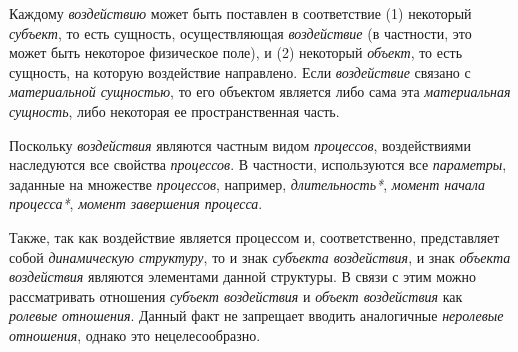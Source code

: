 \begin{frame}{}
    \begin{SCn}
        Каждому \textit{воздействию} может быть поставлен в соответствие (1) некоторый \textit{субъект\scnrolesign}, то есть сущность, осуществляющая \textit{воздействие} (в частности, это может быть некоторое физическое поле), и (2) некоторый \textit{объект\scnrolesign}, то есть сущность, на которую воздействие направлено. Если \textit{воздействие} связано с \textit{материальной сущностью}, то его объектом является либо сама эта \textit{материальная сущность}, либо некоторая ее пространственная часть.

    \end{SCn}
\end{frame}
\begin{frame}{}
    \begin{SCn}
Поскольку \textit{воздействия} являются частным видом \textit{процессов}, воздействиями наследуются все свойства \textit{процессов}. В частности, используются все \textit{параметры}, заданные на множестве \textit{процессов}, например, \textit{длительность*}, \textit{момент начала процесса*}, \textit{момент завершения процесса\scnsupergroupsign}.

Также, так как воздействие является процессом и, соответственно, представляет собой \textit{динамическую структуру}, то и знак \textit{субъекта воздействия\scnrolesign}, и знак \textit{объекта воздействия\scnrolesign} являются элементами данной структуры. В связи с этим можно рассматривать отношения \textit{субъект воздействия\scnrolesign} и \textit{объект воздействия\scnrolesign} как \textit{ролевые отношения}. Данный факт не запрещает вводить аналогичные \textit{неролевые отношения}, однако это нецелесообразно.

    \end{SCn}
\end{frame}

